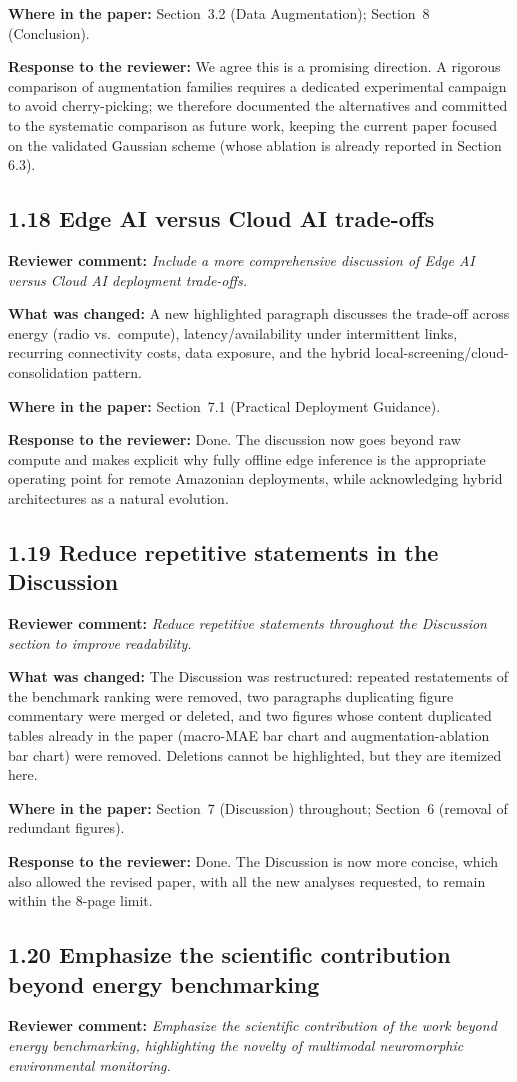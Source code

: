 \documentclass[11pt,a4paper]{article}
\newcommand{\comment}[1]{\textbf{Reviewer comment:} \textit{#1}}
\newcommand{\change}[1]{\textbf{What was changed:} #1}
\newcommand{\where}[1]{\textbf{Where in the paper:} #1}
\newcommand{\resp}[1]{\textbf{Response to the reviewer:} \textcolor{revblue}{#1}}
\newcommand{\pt}[1]{\subsection*{#1}}
\begin{document}
\where{Section~3.2 (Data Augmentation); Section~8 (Conclusion).}

\resp{We agree this is a promising direction. A rigorous comparison of augmentation families requires a dedicated experimental campaign to avoid cherry-picking; we therefore documented the alternatives and committed to the systematic comparison as future work, keeping the current paper focused on the validated Gaussian scheme (whose ablation is already reported in Section 6.3).}

\pt{1.18 Edge AI versus Cloud AI trade-offs}
\comment{Include a more comprehensive discussion of Edge AI versus Cloud AI deployment trade-offs.}

\change{A new highlighted paragraph discusses the trade-off across energy (radio vs.\ compute), latency/availability under intermittent links, recurring connectivity costs, data exposure, and the hybrid local-screening/cloud-consolidation pattern.}

\where{Section~7.1 (Practical Deployment Guidance).}

\resp{Done. The discussion now goes beyond raw compute and makes explicit why fully offline edge inference is the appropriate operating point for remote Amazonian deployments, while acknowledging hybrid architectures as a natural evolution.}

\pt{1.19 Reduce repetitive statements in the Discussion}
\comment{Reduce repetitive statements throughout the Discussion section to improve readability.}

\change{The Discussion was restructured: repeated restatements of the benchmark ranking were removed, two paragraphs duplicating figure commentary were merged or deleted, and two figures whose content duplicated tables already in the paper (macro-MAE bar chart and augmentation-ablation bar chart) were removed. Deletions cannot be highlighted, but they are itemized here.}

\where{Section~7 (Discussion) throughout; Section~6 (removal of redundant figures).}

\resp{Done. The Discussion is now more concise, which also allowed the revised paper, with all the new analyses requested, to remain within the 8-page limit.}

\pt{1.20 Emphasize the scientific contribution beyond energy benchmarking}
\comment{Emphasize the scientific contribution of the work beyond energy benchmarking, highlighting the novelty of multimodal neuromorphic environmental monitoring.}
\end{document}
